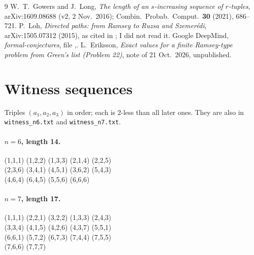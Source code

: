 \documentclass[11pt]{article}
\begin{document}
\begin{thebibliography}{9}
 W.~T.~Gowers and J.~Long, \emph{The length of an $s$-increasing sequence of $r$-tuples}, arXiv:1609.08688 (v2, 2 Nov.\ 2016); Combin.\ Probab.\ Comput.\ \textbf{30} (2021), 686--721.
 P.~Loh, \emph{Directed paths: from Ramsey to Ruzsa and Szemer\'edi}, arXiv:1505.07312 (2015), as cited in \cite{gl}; I did not read it.
 Google DeepMind, \emph{formal-conjectures}, file ,.
 L.~Eriksson, \emph{Exact values for a finite Ramsey-type problem from Green's list (Problem 22)}, note of 21 Oct.\ 2026, unpublished.
\end{thebibliography}

\appendix
\section{Witness sequences}
Triples $(a_1,a_2,a_3)$ in order; each is $2$-less than all later ones. They are also in \texttt{witness\_n6.txt} and \texttt{witness\_n7.txt}.

\paragraph{$n=6$, length 14.}
\begin{center}\ttfamily\small
(1,1,1) (1,2,2) (1,3,3) (2,1,4) (2,2,5) \\
(2,3,6) (3,4,1) (4,5,1) (3,6,2) (5,4,3) \\
(4,6,4) (6,4,5) (5,5,6) (6,6,6)
\end{center}

\paragraph{$n=7$, length 17.}
\begin{center}\ttfamily\small
(1,1,1) (2,2,1) (3,2,2) (1,3,3) (2,4,3) \\
(3,3,4) (4,1,5) (4,2,6) (4,3,7) (5,5,1) \\
(6,6,1) (5,7,2) (6,7,3) (7,4,4) (7,5,5) \\
(7,6,6) (7,7,7)
\end{center}
\end{document}
